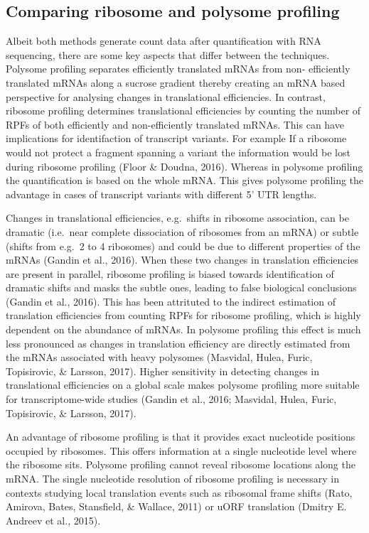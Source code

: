 \documentclass[
  12pt,
  openany]{book}
\begin{document}
\subsection{Comparing ribosome and polysome profiling}

Albeit both methods generate count data after quantification with RNA sequencing, there are some key aspects that differ between the techniques. Polysome profiling separates efficiently translated mRNAs from non- efficiently translated mRNAs along a sucrose gradient thereby creating an mRNA based perspective for analysing changes in translational efficiencies. In contrast, ribosome profiling determines translational efficiencies by counting the number of RPFs of both efficiently and non-efficiently translated mRNAs. This can have implications for identifaction of transcript variants. For example If a ribosome would not protect a fragment spanning a variant the information would be lost during ribosome profiling (Floor \& Doudna, 2016). Whereas in polysome profiling the quantification is based on the whole mRNA. This gives polysome profiling the advantage in cases of transcript variants with different 5' UTR lengths.

Changes in translational efficiencies, e.g.~shifts in ribosome association, can be dramatic (i.e.~near complete dissociation of ribosomes from an mRNA) or subtle (shifts from e.g.~2 to 4 ribosomes) and could be due to different properties of the mRNAs (Gandin et al., 2016). When these two changes in translation efficiencies are present in parallel, ribosome profiling is biased towards identification of dramatic shifts and masks the subtle ones, leading to false biological conclusions (Gandin et al., 2016). This has been attrituted to the indirect estimation of translation efficiencies from counting RPFs for ribosome profiling, which is highly dependent on the abundance of mRNAs. In polysome profiling this effect is much less pronounced as changes in translation efficiency are directly estimated from the mRNAs associated with heavy polysomes (Masvidal, Hulea, Furic, Topisirovic, \& Larsson, 2017). Higher sensitivity in detecting changes in translational efficiencies on a global scale makes polysome profiling more suitable for transcriptome-wide studies (Gandin et al., 2016; Masvidal, Hulea, Furic, Topisirovic, \& Larsson, 2017).

An advantage of ribosome profiling is that it provides exact nucleotide positions occupied by ribosomes. This offers information at a single nucleotide level where the ribosome sits. Polysome profiling cannot reveal ribosome locations along the mRNA. The single nucleotide resolution of ribosome profiling is necessary in contexts studying local translation events such as ribosomal frame shifts (Rato, Amirova, Bates, Stansfield, \& Wallace, 2011) or uORF translation (Dmitry E. Andreev et al., 2015).
\end{document}
